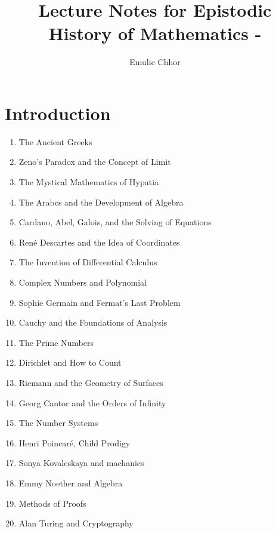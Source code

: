 \documentclass{article}
\begin{document}
\title{Lecture Notes for Epistodic History of Mathematics - }
\author{Emulie Chhor}
\maketitle

\section*{Introduction}

\begin{enumerate}
    \item The Ancient Greeks
    \item Zeno's Paradox and the Concept of Limit
    \item The Mystical Mathematics of Hypatia
    \item The Arabcs and the Development of Algebra
    \item Cardano, Abel, Galois, and the Solving of Equations
    \item René Descartes and the Idea of Coordinates
    \item The Invention of Differential Calculus
    \item Complex Numbers and Polynomial
    \item Sophie Germain and Fermat's Last Problem
    \item Cauchy and the Foundations of Analysis
    \item The Prime Numbers
    \item Dirichlet and How to Count
    \item Riemann and the Geometry of Surfaces
    \item Georg Cantor and the Orders of Infinity
    \item The Number Systems
    \item Henri Poincaré, Child Prodigy
    \item Sonya Kovaleskaya and machanics
    \item Emmy Noether and Algebra
    \item Methods of Proofs
    \item Alan Turing and Cryptography
\end{enumerate}


\newtheorem{definition}{Definition}[subsection]
\newtheorem{theorem}{Theorem}[subsection]
\newtheorem{corollary}{Corollary}[subsection]
\newtheorem{lemma}[theorem]{Lemma}
\newtheorem{proposition}{Proposition}[section]
\newtheorem{axiom}{Axiome}
\newtheorem{property}{Propriété}[subsection]
\newtheorem*{remark}{Remarque}
\newtheorem*{problem}{Problème}
\newtheorem*{intuition}{Intuition}
\end{document}

